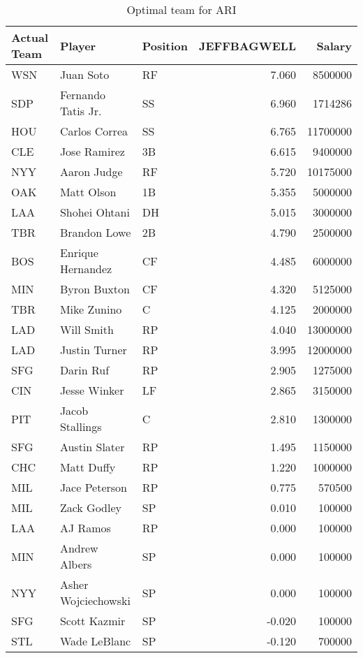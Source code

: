 \begin{table}

\caption{Optimal team for ARI}
\centering
\begin{tabular}[t]{l|l|l|r|r}
\hline
Actual Team & Player & Position & JEFFBAGWELL & Salary\\
\hline
WSN & Juan Soto & RF & 7.060 & 8500000\\
\hline
SDP & Fernando Tatis Jr. & SS & 6.960 & 1714286\\
\hline
HOU & Carlos Correa & SS & 6.765 & 11700000\\
\hline
CLE & Jose Ramirez & 3B & 6.615 & 9400000\\
\hline
NYY & Aaron Judge & RF & 5.720 & 10175000\\
\hline
OAK & Matt Olson & 1B & 5.355 & 5000000\\
\hline
LAA & Shohei Ohtani & DH & 5.015 & 3000000\\
\hline
TBR & Brandon Lowe & 2B & 4.790 & 2500000\\
\hline
BOS & Enrique Hernandez & CF & 4.485 & 6000000\\
\hline
MIN & Byron Buxton & CF & 4.320 & 5125000\\
\hline
TBR & Mike Zunino & C & 4.125 & 2000000\\
\hline
LAD & Will Smith & RP & 4.040 & 13000000\\
\hline
LAD & Justin Turner & RP & 3.995 & 12000000\\
\hline
SFG & Darin Ruf & RP & 2.905 & 1275000\\
\hline
CIN & Jesse Winker & LF & 2.865 & 3150000\\
\hline
PIT & Jacob Stallings & C & 2.810 & 1300000\\
\hline
SFG & Austin Slater & RP & 1.495 & 1150000\\
\hline
CHC & Matt Duffy & RP & 1.220 & 1000000\\
\hline
MIL & Jace Peterson & RP & 0.775 & 570500\\
\hline
MIL & Zack Godley & SP & 0.010 & 100000\\
\hline
LAA & AJ Ramos & RP & 0.000 & 100000\\
\hline
MIN & Andrew Albers & SP & 0.000 & 100000\\
\hline
NYY & Asher Wojciechowski & SP & 0.000 & 100000\\
\hline
SFG & Scott Kazmir & SP & -0.020 & 100000\\
\hline
STL & Wade LeBlanc & SP & -0.120 & 700000\\
\hline
\end{tabular}
\end{table}
